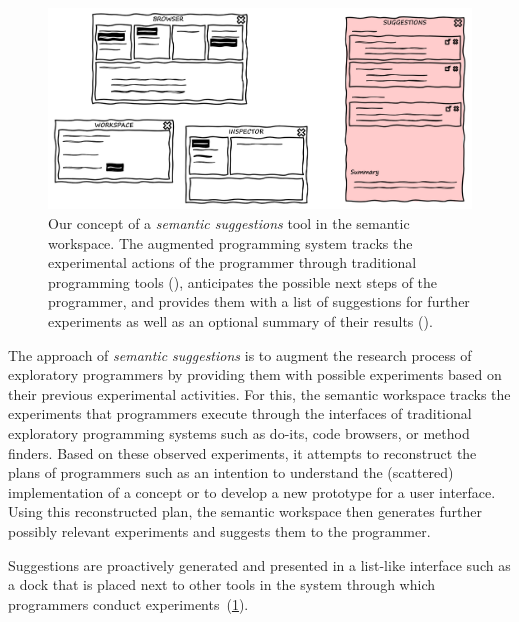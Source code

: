 \begin{figure}
	\centering
	\includegraphics[width=\textwidth]{02_workspace/suggestions.png}
	\caption[Our concept of a \emph{semantic suggestions} tool in the semantic workspace.]{
		Our concept of a \emph{semantic suggestions} tool in the semantic workspace.
		The augmented programming system tracks the experimental actions of the programmer through traditional programming tools (\bold{\textcolor{gray}{gray}}), anticipates the possible next steps of the programmer, and provides them with a list of suggestions for further experiments as well as an optional summary of their results (\bold{\textcolor{red}{red}}).
	}
	\label{fig:approach/workspace/suggestions}
\end{figure}

The approach of \emph{semantic suggestions} is to augment the research process of exploratory programmers by providing them with possible experiments based on their previous experimental activities.
For this, the semantic workspace tracks the experiments that programmers execute through the interfaces of traditional exploratory programming systems such as do-its, code browsers, or method finders.
Based on these observed experiments, it attempts to reconstruct the plans of programmers such as an intention to understand the (scattered) implementation of a concept or to develop a new prototype for a user interface.
Using this reconstructed plan, the semantic workspace then generates further possibly relevant experiments and suggests them to the programmer.

Suggestions are proactively generated and presented in a list-like interface such as a dock that is placed next to other tools in the system through which programmers conduct experiments~(\cref{fig:approach/workspace/suggestions}).

